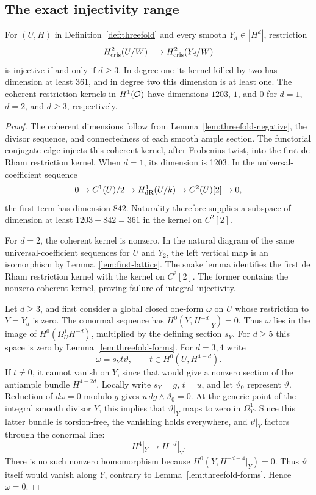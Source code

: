 \subsection{The exact injectivity range}

\begin{theorem}\label{thm:injectivity-exact}
For $(U,H)$ in Definition~\ref{def:threefold} and every smooth $Y_d\in|H^d|$, restriction
\[
 H^2_{\mathrm{cris}}(U/W)\longrightarrow H^2_{\mathrm{cris}}(Y_d/W)
\]
is injective if and only if $d\ge3$. In degree one its kernel killed by two has dimension at least 361, and in degree two this dimension is at least one. The coherent restriction kernels in $H^1(\mathcal O)$ have dimensions $1203$, $1$, and $0$ for $d=1$, $d=2$, and $d\ge3$, respectively.
\end{theorem}
\begin{proof}
The coherent dimensions follow from Lemma~\ref{lem:threefold-negative}, the divisor sequence, and connectedness of each smooth ample section. The functorial conjugate edge injects this coherent kernel, after Frobenius twist, into the first de Rham restriction kernel. When $d=1$, its dimension is 1203. In the universal-coefficient sequence
\[
 0\to C^1(U)/2\to H^1_{\mathrm{dR}}(U/k)\to C^2(U)[2]\to0,
\]
the first term has dimension $842$. Naturality therefore supplies a subspace of dimension at least $1203-842=361$ in the kernel on $C^2[2]$.

For $d=2$, the coherent kernel is nonzero. In the natural diagram of the same universal-coefficient sequences for $U$ and $Y_2$, the left vertical map is an isomorphism by Lemma~\ref{lem:first-lattice}. The snake lemma identifies the first de Rham restriction kernel with the kernel on $C^2[2]$. The former contains the nonzero coherent kernel, proving failure of integral injectivity.

Let $d\ge3$, and first consider a global closed one-form $\omega$ on $U$ whose restriction to $Y=Y_d$ is zero. The conormal sequence has $H^0(Y,H^{-d}|_Y)=0$. Thus $\omega$ lies in the image of $H^0(\Omega_U^1H^{-d})$, multiplied by the defining section $s_Y$. For $d\ge5$ this space is zero by Lemma~\ref{lem:threefold-forms}. For $d=3,4$ write
\[
 \omega=s_Yt\vartheta,\qquad t\in H^0(U,H^{4-d}).
\]
If $t\ne0$, it cannot vanish on $Y$, since that would give a nonzero section of the antiample bundle $H^{4-2d}$. Locally write $s_Y=g$, $t=u$, and let $\vartheta_0$ represent $\vartheta$. Reduction of $d\omega=0$ modulo $g$ gives
$u\,dg\wedge\vartheta_0=0$. At the generic point of the integral smooth divisor $Y$, this implies that $\vartheta|_Y$ maps to zero in $\Omega_Y^1$. Since this latter bundle is torsion-free, the vanishing holds everywhere, and $\vartheta|_Y$ factors through the conormal line:
\[
 H^4|_Y\longrightarrow H^{-d}|_Y.
\]
There is no such nonzero homomorphism because $H^0(Y,H^{-d-4}|_Y)=0$. Thus $\vartheta$ itself would vanish along $Y$, contrary to Lemma~\ref{lem:threefold-forms}. Hence $\omega=0$.


\end{proof}
